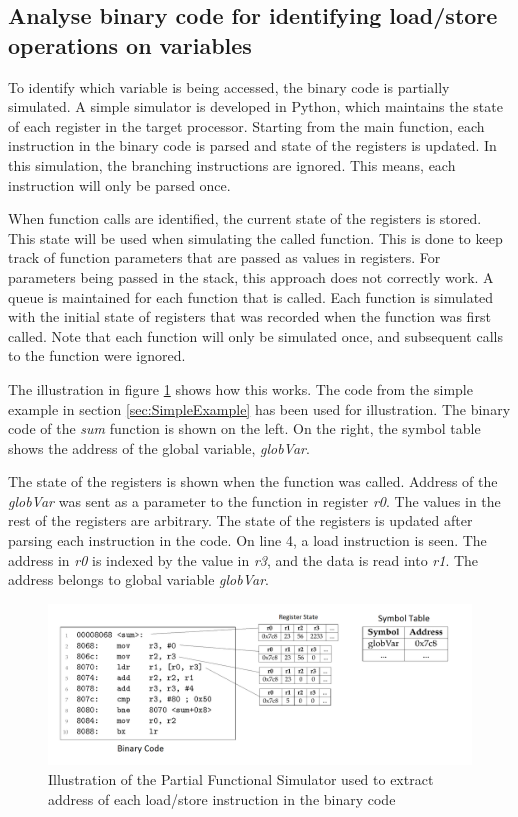 \subsection{Analyse binary code for identifying load/store operations on variables}
\label{subsec:analyseBinary}
To identify which variable is being accessed, the binary code is partially simulated. A simple simulator is developed in Python, which maintains the state of each register in the target processor. Starting from the main function, each instruction in the binary code is parsed and state of the registers is updated. In this simulation, the branching instructions are ignored. This means, each instruction will only be parsed once. 

When function calls are identified, the current state of the registers is stored. This state will be used when simulating the called function. This is done to keep track of function parameters that are passed as values in registers. For parameters being passed in the stack, this approach does not correctly work. A queue is maintained for each function that is called. Each function is simulated with the initial state of registers that was recorded when the function was first called. Note that each function will only be simulated once, and subsequent calls to the function were ignored.

The illustration in figure \ref{fig:partialSimulator} shows how this works. The code from the simple example in section \ref{sec:SimpleExample} has been used for illustration. The binary code of the \emph{sum} function is shown on the left. On the right, the symbol table shows the address of the global variable, \emph{globVar}. 

The state of the registers is shown when the function was called. Address of the \emph{globVar} was sent as a parameter to the function in register \emph{r0}. The values in the rest of the registers are arbitrary. The state of the registers is updated after parsing each instruction in the code. On line 4, a load instruction is seen. The address in \emph{r0} is indexed by the value in \emph{r3}, and the data is read into \emph{r1}. The address belongs to global variable \emph{globVar}. 

\begin{figure}[h]
\centering
\includegraphics[width=\textwidth]{figures/ParitalSimulator.png}
\caption{Illustration of the Partial Functional Simulator used to extract address of each load/store instruction in the binary code}
\label{fig:partialSimulator}
\end{figure}

